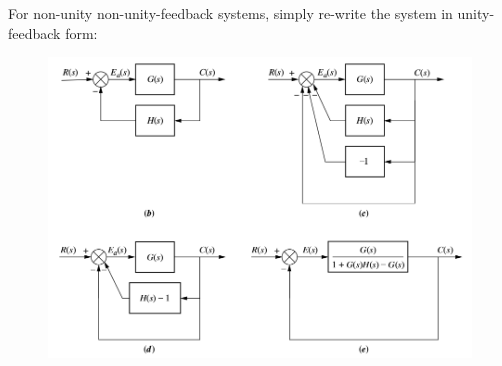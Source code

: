 \documentclass[ 10pt, xcolor = dvipsnames]{beamer}
\begin{document}
\begin{frame}[allowframebreaks]
\frametitle{\insertsection}

For non-unity non-unity-feedback systems, simply re-write the system in unity-feedback form: 
\fullskip

\begin{figure}
\centering
\includegraphics[width=0.7\columnwidth]{figures/Nise_Fig-7-15.jpg}
\end{figure}

\end{frame}
\end{document}
